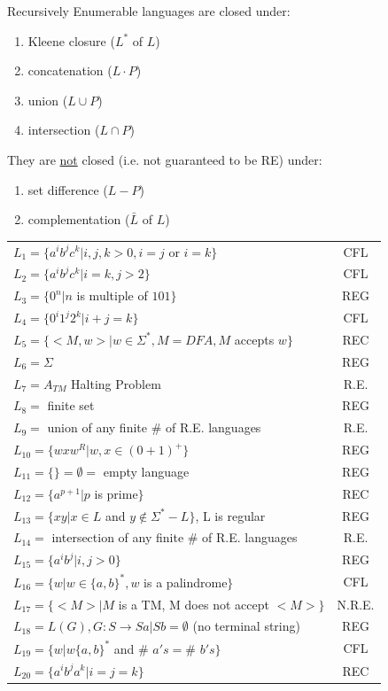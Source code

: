 \documentclass[8pt,letterpaper,twocolumn]{article}
\begin{document}
Recursively Enumerable languages are closed under:
\begin{enumerate}
  \item Kleene closure ($L^*$ of $L$)
  \item concatenation ($L \cdot P$)
  \item union ($L \cup P$)
  \item intersection ($L \cap P$)
\end{enumerate}
They are \underline{not} closed (i.e. not guaranteed to be RE) under:
\begin{enumerate}
  \item set difference ($L - P$)
  \item complementation ($\bar{L}$ of $L$)
\end{enumerate}
\begin{tabular}{l | c}
$L_1 = \{a^i b^j c^k | i,j,k > 0, i=j$ or $i=k\}$ & CFL \\
$L_2 = \{a^i b^j c^k | i = k, j > 2\}$ & CFL \\
$L_3 = \{0^n | n$ is multiple of $101\}$ & REG \\
$L_4 = \{0^i 1^j 2^k | i + j = k\}$ & CFL \\
$L_5 = \{<M,w> | w \in \Sigma^*, M = DFA, M$ accepts $w\}$ & REC \\
$L_6 = \Sigma$ & REG \\
$L_7 = A_{TM}$ Halting Problem & R.E. \\
$L_8 =$ finite set & REG \\
$L_9 =$ union of any finite \# of R.E. languages & R.E. \\
$L_{10} = \{wxw^R | w,x \in (0+1)^+\}$ & REG \\
$L_{11} = \{\} = \emptyset = $ empty language & REG \\
$L_{12} = \{a^{p+1} | p$ is prime$\}$ & REC \\
$L_{13} = \{xy | x \in L$ and $y \notin \Sigma^* - L\}$, L is regular & REG \\
$L_{14} =$ intersection of any finite \# of R.E. languages & R.E. \\
$L_{15} = \{a^i b^j | i,j > 0\}$ & REG \\
$L_{16} = \{w | w \in \{a,b\}^*, w$ is a palindrome$ \}$ & CFL \\
$L_{17} = \{<M> | M$ is a TM, M does not accept $<M>\}$ & N.R.E. \\
$L_{18} = L(G), G: S \rightarrow Sa | Sb = \emptyset$ (no terminal string)  & REG \\
$L_{19} = \{w | w \{a,b\}^*$ and \# $ a's = $\# $ b's \}$ & CFL \\
$L_{20} = \{a^i b^j a^k | i = j = k\}$ & REC \\
\end{tabular}
\end{document}
